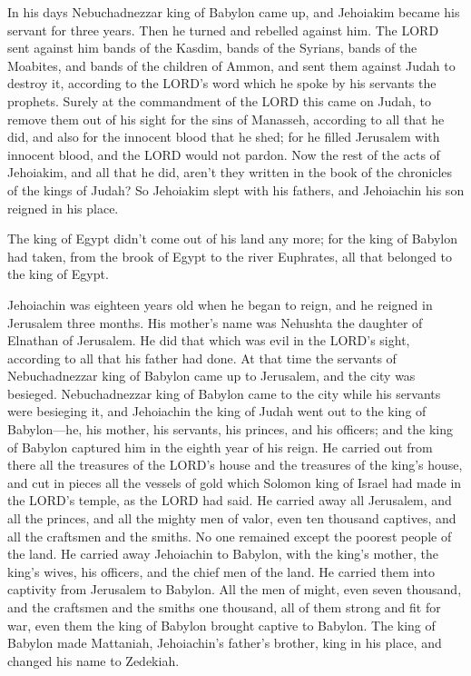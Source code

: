 \mychapter{} \myverse*{}In his days Nebuchadnezzar king of Babylon came up, and Jehoiakim
became his servant for three years. Then he turned and rebelled against him.
\myverse{}The LORD sent against him bands of the Kasdim, bands of the Syrians, bands
of the Moabites, and bands of the children of Ammon, and sent them against Judah to destroy it, according
to the LORD’s word which he spoke by his servants the prophets.
\myverse{}Surely at the commandment of the LORD this came on Judah, to remove them out
of his sight for the sins of Manasseh, according to all that he did,
\myverse{}and also for the innocent blood that he shed; for he filled Jerusalem with
innocent blood, and the LORD would not pardon.
\myverse{}Now the rest of the acts of Jehoiakim, and all that he did, aren’t they written
in the book of the chronicles of the kings of Judah?
\myverse{}So Jehoiakim slept with his fathers, and Jehoiachin his son reigned in his
place.

\myverse{}The king of Egypt didn’t come out of his land any more; for the
king of Babylon had taken, from the brook of Egypt to the river Euphrates, all that belonged to the king
of Egypt.

\myverse{}Jehoiachin was eighteen years old when he began to reign, and
he reigned in Jerusalem three months. His mother’s name was Nehushta the daughter of Elnathan of Jerusalem.
\myverse{}He did that which was evil in the LORD’s sight, according to all that his father
had done.
\myverse{}At that time the servants of Nebuchadnezzar king of Babylon came up to Jerusalem,
and the city was besieged.
\myverse{}Nebuchadnezzar king of Babylon came to the city while his servants were besieging
it,
\myverse{}and Jehoiachin the king of Judah went out to the king of Babylon—he, his
mother, his servants, his princes, and his officers; and the king of Babylon captured him in the eighth
year of his reign.
\myverse{}He carried out from there all the treasures of the LORD’s house and the treasures
of the king’s house, and cut in pieces all the vessels of gold which Solomon king of Israel had made in
the LORD’s temple, as the LORD had said.
\myverse{}He carried away all Jerusalem, and all the princes, and all the mighty men
of valor, even ten thousand captives, and all the craftsmen and the smiths. No one remained except the
poorest people of the land.
\myverse{}He carried away Jehoiachin to Babylon, with the king’s mother, the king’s
wives, his officers, and the chief men of the land. He carried them into captivity from Jerusalem to Babylon.
\myverse{}All the men of might, even seven thousand, and the craftsmen and the smiths
one thousand, all of them strong and fit for war, even them the king of Babylon brought captive to Babylon.
\myverse{}The king of Babylon made Mattaniah, Jehoiachin’s father’s brother, king in
his place, and changed his name to Zedekiah.

